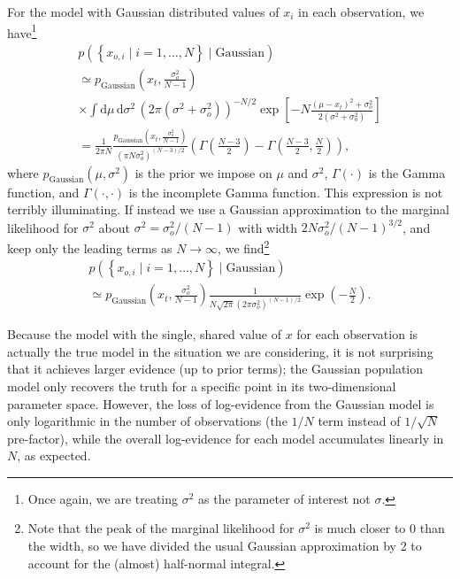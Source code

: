 \documentclass[modern]{aastex631}
\begin{document}
For the model with Gaussian distributed values of $x_i$ in each observation, we
have\footnote{Once again, we are treating $\sigma^2$ as the parameter of
interest not $\sigma$.}
\begin{multline}
    p\left( \left\{ x_{o,i} \mid i = 1, \ldots, N \right\} \mid \mathrm{Gaussian} \right) \\ \simeq p_\mathrm{Gaussian}\left( x_t, \frac{\sigma_o^2}{N-1} \right) \\ \times \int \mathrm{d} \mu \, \mathrm{d} \sigma^2 \, \left( 2 \pi \left( \sigma^2 + \sigma_o^2 \right)\right)^{-N/2} \exp\left[ - N \frac{\left( \mu - x_t \right)^2 + \sigma_o^2}{2 \left( \sigma^2 + \sigma_o^2 \right)} \right] \\ = \frac{1}{2 \pi N} \frac{p_\mathrm{Gaussian}\left( x_t, \frac{\sigma_o^2}{N-1} \right)}{\left( \pi N \sigma_o^2 \right)^{(N-3)/2}} \left( \Gamma\left(\frac{N-3}{2} \right) - \Gamma\left( \frac{N-3}{2} , \frac{N}{2} \right) \right),
\end{multline}
where $p_\mathrm{Gaussian}\left( \mu, \sigma^2 \right)$ is the prior we impose
on $\mu$ and $\sigma^2$, $\Gamma\left( \cdot \right)$ is the Gamma function, and
$\Gamma\left( \cdot, \cdot \right)$ is the incomplete Gamma function.  This
expression is not terribly illuminating.  If instead we use a Gaussian
approximation to the marginal likelihood for $\sigma^2$ about $\sigma^2 =
\sigma_o^2/\left( N - 1 \right)$ with width $2 N \sigma_o^2 / \left( N - 1
\right)^{3/2}$, and keep only the leading terms as $N \to \infty$, we
find\footnote{Note that the peak of the marginal likelihood for $\sigma^2$ is
much closer to 0 than the width, so we have divided the usual Gaussian
approximation by 2 to account for the (almost) half-normal integral.} 
\begin{multline}
    \label{eq:gaussian-evidence}
    p\left( \left\{ x_{o,i} \mid i = 1, \ldots, N \right\} \mid \mathrm{Gaussian} \right) \\ \simeq p_\mathrm{Gaussian}\left( x_t, \frac{\sigma_o^2}{N-1} \right) \frac{1}{N \sqrt{2\pi} \left( 2 \pi \sigma_o^2 \right)^{(N-1)/2}} \exp\left( -\frac{N}{2} \right).
\end{multline}

Because the model with the single, shared value of $x$ for each observation is
actually the true model in the situation we are considering, it is not
surprising that it achieves larger evidence (up to prior terms); the Gaussian
population model only recovers the truth for a specific point in its
two-dimensional parameter space.  However, the loss of log-evidence from the
Gaussian model is only logarithmic in the number of observations (the $1/N$ term
instead of $1/\sqrt{N}$ pre-factor), while the overall log-evidence for each
model accumulates linearly in $N$, as expected.
\end{document}
